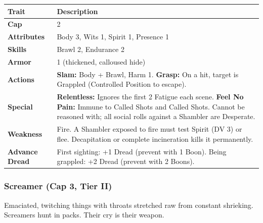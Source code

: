 \documentclass[11pt]{article}
\begin{document}
\begin{center}
\begin{longtable}{|p{3cm}|p{10cm}|}
\hline
\rowcolor{tableheader}
\textbf{Trait} & \textbf{Description} \\
\hline
\textbf{Cap} & 2 \\
\hline
\textbf{Attributes} & Body 3, Wits 1, Spirit 1, Presence 1 \\
\hline
\textbf{Skills} & Brawl 2, Endurance 2 \\
\hline
\textbf{Armor} & 1 (thickened, calloused hide) \\
\hline
\textbf{Actions} & \textbf{Slam:} Body + Brawl, Harm 1. \textbf{Grasp:} On a hit, target is Grappled (Controlled Position to escape). \\
\hline
\textbf{Special} & \textbf{Relentless:} Ignores the first 2 Fatigue each scene. \textbf{Feel No Pain:} Immune to Called Shots and Called Shots. Cannot be reasoned with; all social rolls against a Shambler are Desperate. \\
\hline
\textbf{Weakness} & Fire. A Shambler exposed to fire must test Spirit (DV 3) or flee. Decapitation or complete incineration kills it permanently. \\
\hline
\textbf{Advance Dread} & First sighting: +1 Dread (prevent with 1 Boon). Being grappled: +2 Dread (prevent with 2 Boons). \\
\hline
\end{longtable}
\end{center}

\subsubsection{Screamer (Cap 3, Tier II)}

Emaciated, twitching things with throats stretched raw from constant shrieking. Screamers hunt in packs. Their cry is their weapon.
\end{document}
